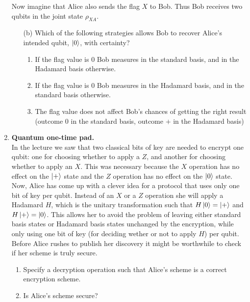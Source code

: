 \documentclass[12pt]{article}
\begin{document}
\begin{enumerate}
Now imagine that Alice also sends the flag $X$ to Bob. Thus Bob receives two qubits in the joint state $\rho_{XA}$.
\begin{enumerate}
\item[(b)] Which of the following strategies allows Bob to recover Alice's intended qubit, $\ket{0}$, with certainty? 
\begin{enumerate}
\item If the flag value is $0$ Bob measures in the standard basis, and in the Hadamard basis otherwise.
\item If the flag value is $0$ Bob measures in the Hadamard basis, and in the standard basis otherwise.
\item The flag value does not affect Bob's chances of getting the right result (outcome $0$ in the standard basis, outcome $+$ in the Hadamard basis)
\end{enumerate}
\end{enumerate}

\item {\bf Quantum one-time pad.}\\
In the lecture we saw that two classical bits of key are needed to encrypt one qubit: one for choosing whether to apply a $Z$, and another for choosing whether to apply an $X$. This was necessary because the $X$ operation has no effect on the $\ket{+}$ state and the $Z$ operation has no effect on the $\ket{0}$ state. Now, Alice has come up with a clever idea for a protocol that uses only one bit of key per qubit. Instead of an $X$ or a $Z$ operation she will apply a Hadamard $H$, which is the unitary transformation such that $H\ket{0} = \ket{+}$ and $H\ket{+} = \ket{0}$. This allows her to avoid the problem of leaving either standard basis states or Hadamard basis states unchanged by the encryption, while only using one bit of key (for deciding wether or not to apply $H$) per qubit. Before Alice rushes to publish her discovery it might be worthwhile to check if her scheme is truly secure.
\begin{enumerate}
\item Specify a decryption operation such that Alice's scheme is a correct encryption scheme. 
\item Is Alice's scheme secure? 
\end{enumerate}


\end{enumerate}
\end{document}
